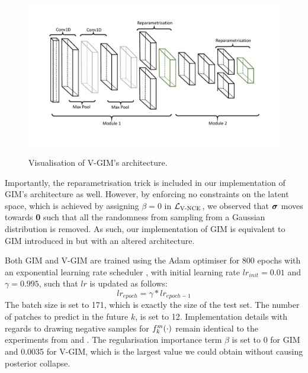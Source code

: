 		\begin{figure}
			\centering
			\hspace*{1.5cm}
			\begin{annotatedFigure}
				{\includegraphics[width=0.8\linewidth, trim={0 2.8cm 0 2cm}, clip]{"graphs/vgim architecture"} }
				
				
				
				
			\end{annotatedFigure}
			\caption{Visualisation of V-GIM's architecture.}
			\label{fig:architecture}
		\end{figure}
		
		
		Importantly, the reparametrisation trick is included in our implementation of GIM's architecture as well. However, by enforcing no constraints on the latent space, which is achieved by assigning $\beta = 0$ in $\mathcal{L}_{\text{V-NCE}}$, we observed that $\bm{\sigma}$ moves towards \textbf{0} such that all the randomness from sampling from a Gaussian distribution is removed. As such, our implementation of GIM is equivalent to GIM introduced in \cite{lowePuttingEndEndtoEnd2020} but with an altered architecture.
		
		Both GIM and V-GIM are trained using the Adam optimiser for 800 epochs with an exponential learning rate scheduler \cite{bhargavladGuidePytorchLearning}, with initial learning rate $lr_{init} = 0.01$ and $\gamma=0.995$, such that $lr$ is updated as follows:
		$$lr_{epoch} = \gamma * lr_{epoch - 1}$$
		The batch size is set to 171, which is exactly the size of the test set. The number of patches to predict in the future $k$, is set to 12. Implementation details with regards to drawing negative samples for $f_k^m(\cdot)$ remain identical to the experiments from \cite{oordRepresentationLearningContrastive2019} and \cite{lowePuttingEndEndtoEnd2020}. The regularisation importance term $\beta$ is set to 0 for GIM and 0.0035 for V-GIM, which is the largest value we could obtain without causing posterior collapse.

